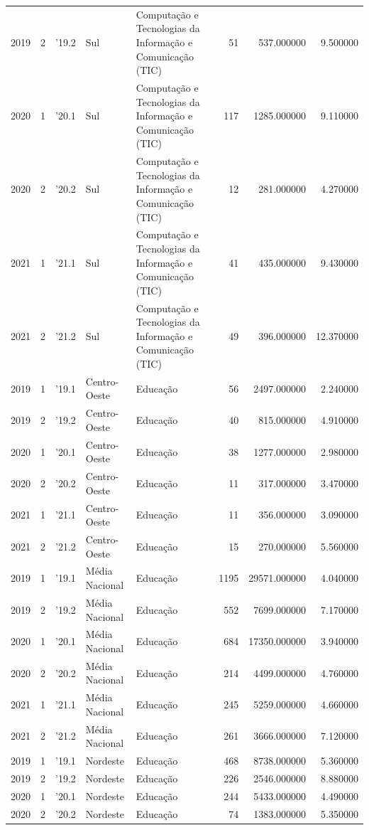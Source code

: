 \begin{longtable}{rrlllrrr}
2019 & 2 & '19.2 & Sul & Computação e Tecnologias da Informação e Comunicação (TIC) & 51 & 537.000000 & 9.500000 \\
2020 & 1 & '20.1 & Sul & Computação e Tecnologias da Informação e Comunicação (TIC) & 117 & 1285.000000 & 9.110000 \\
2020 & 2 & '20.2 & Sul & Computação e Tecnologias da Informação e Comunicação (TIC) & 12 & 281.000000 & 4.270000 \\
2021 & 1 & '21.1 & Sul & Computação e Tecnologias da Informação e Comunicação (TIC) & 41 & 435.000000 & 9.430000 \\
2021 & 2 & '21.2 & Sul & Computação e Tecnologias da Informação e Comunicação (TIC) & 49 & 396.000000 & 12.370000 \\
2019 & 1 & '19.1 & Centro-Oeste & Educação & 56 & 2497.000000 & 2.240000 \\
2019 & 2 & '19.2 & Centro-Oeste & Educação & 40 & 815.000000 & 4.910000 \\
2020 & 1 & '20.1 & Centro-Oeste & Educação & 38 & 1277.000000 & 2.980000 \\
2020 & 2 & '20.2 & Centro-Oeste & Educação & 11 & 317.000000 & 3.470000 \\
2021 & 1 & '21.1 & Centro-Oeste & Educação & 11 & 356.000000 & 3.090000 \\
2021 & 2 & '21.2 & Centro-Oeste & Educação & 15 & 270.000000 & 5.560000 \\
2019 & 1 & '19.1 & Média Nacional & Educação & 1195 & 29571.000000 & 4.040000 \\
2019 & 2 & '19.2 & Média Nacional & Educação & 552 & 7699.000000 & 7.170000 \\
2020 & 1 & '20.1 & Média Nacional & Educação & 684 & 17350.000000 & 3.940000 \\
2020 & 2 & '20.2 & Média Nacional & Educação & 214 & 4499.000000 & 4.760000 \\
2021 & 1 & '21.1 & Média Nacional & Educação & 245 & 5259.000000 & 4.660000 \\
2021 & 2 & '21.2 & Média Nacional & Educação & 261 & 3666.000000 & 7.120000 \\
2019 & 1 & '19.1 & Nordeste & Educação & 468 & 8738.000000 & 5.360000 \\
2019 & 2 & '19.2 & Nordeste & Educação & 226 & 2546.000000 & 8.880000 \\
2020 & 1 & '20.1 & Nordeste & Educação & 244 & 5433.000000 & 4.490000 \\
2020 & 2 & '20.2 & Nordeste & Educação & 74 & 1383.000000 & 5.350000 \\

\end{longtable}
